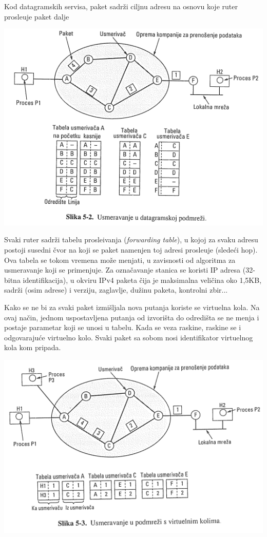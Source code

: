 \documentclass{article} %
\begin{document}
Kod datagramskih servisa, paket sadr\v{z}i ciljnu adresu na osnovu koje ruter prosle\dj{}uje paket dalje

\begin{center}
\includegraphics[scale=0.5]{datagramski-servis}
\end{center}

Svaki ruter sadr\v{z}i tabelu prosle\dj{}ivanja (\textit{forwarding table}), u kojoj za svaku adresu postoji susedni \v{c}vor na koji se paket namenjen toj adresi prosle\dj{}uje (slede\'{c}i hop). Ova tabela se tokom vremena mo\v{z}e menjati, u zavisnosti od algoritma za usmeravanje koji se primenjuje. Za ozna\v{c}avanje stanica se koristi IP adresa (32-bitna identifikacija), u okviru IPv4 paketa \v{c}ija je maksimalna veli\v{c}ina oko 1,5KB, sadr\v{z}i (osim adrese) i verziju, zaglavlje, du\v{z}inu paketa, kontrolni zbir...

Kako se ne bi za svaki paket izmi\v{s}ljala nova putanja koriste se virtuelna kola. Na ovaj na\v{c}in, jednom uspostavljena putanja od izvori\v{s}ta do odredi\v{s}ta se ne menja i postaje parametar koji se unosi u tabelu. Kada se veza raskine, raskine se i odgovaraju\'{c}e virtuelno kolo. Svaki paket sa sobom nosi identifikator virtuelnog kola kom pripada.

\begin{center}
\includegraphics[scale=0.5]{virtuelno-kolo}
\end{center}
\end{document}
